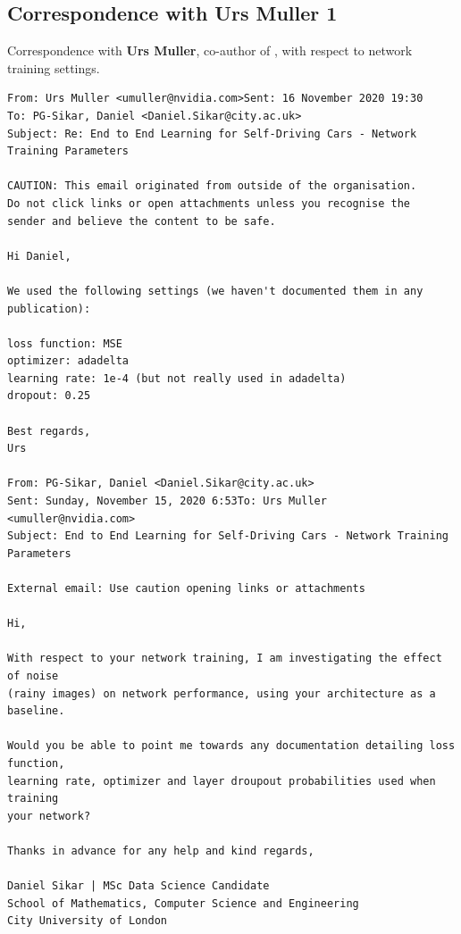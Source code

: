 \subsection{Correspondence with Urs Muller 1}
\label{urs_muller1}
Correspondence with \textbf{Urs Muller}, co-author of \cite{bojarski2016end}, with respect to network training settings.

\begin{verbatim}
From: Urs Muller <umuller@nvidia.com>Sent: 16 November 2020 19:30
To: PG-Sikar, Daniel <Daniel.Sikar@city.ac.uk>
Subject: Re: End to End Learning for Self-Driving Cars - Network Training Parameters

CAUTION: This email originated from outside of the organisation. 
Do not click links or open attachments unless you recognise the
sender and believe the content to be safe.

Hi Daniel,

We used the following settings (we haven't documented them in any publication):

loss function: MSE
optimizer: adadelta
learning rate: 1e-4 (but not really used in adadelta)
dropout: 0.25

Best regards,
Urs

From: PG-Sikar, Daniel <Daniel.Sikar@city.ac.uk>
Sent: Sunday, November 15, 2020 6:53To: Urs Muller <umuller@nvidia.com>
Subject: End to End Learning for Self-Driving Cars - Network Training Parameters
 
External email: Use caution opening links or attachments

Hi,

With respect to your network training, I am investigating the effect of noise 
(rainy images) on network performance, using your architecture as a baseline.

Would you be able to point me towards any documentation detailing loss function, 
learning rate, optimizer and layer droupout probabilities used when training 
your network?

Thanks in advance for any help and kind regards,

Daniel Sikar | MSc Data Science Candidate
School of Mathematics, Computer Science and Engineering
City University of London    
\end{verbatim}

